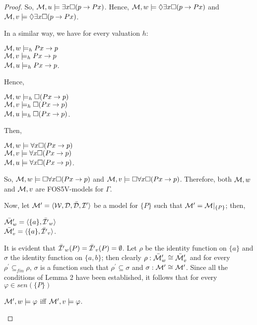\begin{proof}
\qquad So, $\mathcal{M},u \models \exists x \Box (p \rightarrow Px)$. Hence, $\mathcal{M},w \models \Diamond \exists x\Box (p \rightarrow Px)$ and $\mathcal{M},v \models \Diamond \exists x \Box (p \rightarrow Px)$.  

\qquad In a similar way, we have for every valuation $h$:

\begin{center}
$\mathcal{M},w \models_{h} Px \rightarrow p$\\
$\mathcal{M},v \models_{h} Px \rightarrow p$\\
$\mathcal{M},u \models_{h} Px \rightarrow p$.
\end{center}
\qquad Hence,

\begin{center}
$\mathcal{M},w \models_{h} \Box (Px \rightarrow p)$\\
$\mathcal{M},v \models_{h} \Box (Px \rightarrow p)$\\
$\mathcal{M},u \models_{h} \Box (Px \rightarrow p)$.
\end{center}
\qquad Then,

\begin{center}
$\mathcal{M},w \models \forall x\Box (Px \rightarrow p)$\\
$\mathcal{M},v \models \forall x\Box (Px \rightarrow p)$\\
$\mathcal{M},u \models \forall x\Box (Px \rightarrow p)$.
\end{center}

\qquad So, $\mathcal{M},w \models \Box \forall x\Box (Px \rightarrow p)$ and $\mathcal{M},v \models \Box \forall x\Box (Px \rightarrow p)$. Therefore, both $\mathcal{M},w$ and $\mathcal{M},v$ are FOS5V-models for $\Gamma$.

\qquad Now, let $\mathcal{M}^{\prime} = \langle \mathcal{W},\mathcal{D},\bar{\mathcal{D}},\mathcal{I}^{\prime}\rangle$ be a model for $\{P\}$ such that $\mathcal{M}^{\prime} = \mathcal{M}|_{\{P\}}$; then,

\begin{center}
$\bar{\mathcal{M}}_{w}^{\prime} = \langle \{a\}, {\bar{\mathcal{I}^{\prime}}}_{w}\rangle$\\
$\bar{\mathcal{M}}_{v}^{\prime} = \langle \{a\}, {\bar{\mathcal{I}^{\prime}}}_{v} \rangle$.
\end{center}

\qquad It is evident that ${\bar{\mathcal{I}^{\prime}}}_{w}(P) = {\bar{\mathcal{I}^{\prime}}}_{v}(P) = \emptyset$. Let $\rho$ be the identity function on $\{a\}$ and $\sigma$ the identity function on $\{a,b\}$; then clearly $\rho: \bar{\mathcal{M}}_{w}^{\prime} \cong \bar{\mathcal{M}}_{v}^{\prime}$ and for every $\rho^{\prime} \subseteq_{fin} \rho$, $\sigma$ is a function such that $\rho^{\prime} \subseteq \sigma$ and  $\sigma: \mathcal{M}^{\prime} \cong \mathcal{M}^{\prime}$. Since all the conditions of Lemma 2 have been established, it follows that for every $\varphi \in sen(\{P\})$

\begin{center}
$\mathcal{M}^{\prime},w \models \varphi$ iff $\mathcal{M}^{\prime},v \models \varphi$.
\end{center}


\end{proof}

